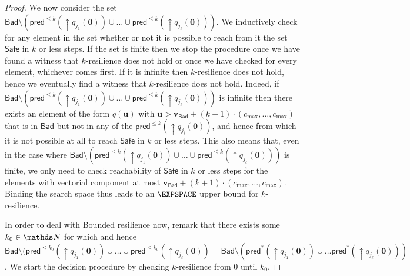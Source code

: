 \documentclass[runningheads]{llncs}
\newcommand{\pred}{\textsf{pred}}
\newcommand{\Bad}{\textsf{Bad}}
\newcommand{\Safe}{\textsf{Safe}}
\begin{document}
\begin{proof}
We now consider the set 
$\Bad \setminus (\pred^{\leq k}(\mathop{\uparrow} q_{j_1}(\textbf{0})) \cup \ldots \cup \pred^{\leq k}(\mathop{\uparrow} q_{j_\ell}(\textbf{0})) )$.
We inductively check for any element in the set whether or not it is possible to reach from it the set $\Safe$ in $k$ or less steps.
If the set is finite then we stop the procedure once we have found a witness that $k$-resilience does not hold or once we have checked for every element, whichever comes first.
If it is infinite then
$k$-resilience does not hold, 
hence we eventually find a witness that $k$-resilience does not hold.
Indeed, 
if
$\Bad \setminus (\pred^{\leq k}(\mathop{\uparrow} q_{j_1}(\textbf{0})) \cup \ldots \cup \pred^{\leq k}(\mathop{\uparrow} q_{j_\ell}(\textbf{0})) )$
is
infinite
then
there exists an element of the form $q(\textbf{u} )$
with $\textbf{u} > \textbf{v}_{\Bad} + (k+1) \cdot (c_{\max}, \ldots, c_{\max})$ 
that is in $\Bad$ but not in any of the $\pred^{\leq k}(\mathop{\uparrow} q_{j_i}(\textbf{0}))$,
and hence from which it is not possible at all to reach
$\Safe$ in $k$ or less steps. This also means that, even in the case where $\Bad \setminus (\pred^{\leq k}(\mathop{\uparrow} q_{j_1}(\textbf{0})) \cup \ldots \cup \pred^{\leq k}(\mathop{\uparrow} q_{j_\ell}(\textbf{0})) )$ is finite, we only need to check reachability of $\Safe$ in $k$ or less steps for the elements with vectorial component at most
$ \textbf{v}_{\Bad} + (k+1) \cdot (c_{\max}, \ldots, c_{\max})$. Binding the search space
thus leads to an $\EXPSPACE$ upper bound for {\sc $k$-resilience}.


In order to deal with {\sc Bounded resilience} now, remark that there exists some $k_0 \in \N$ for which
and hence
$\Bad \setminus (\pred^{\leq k_0}(\mathop{\uparrow} q_{j_1}(\textbf{0}))\cup \ldots \cup \pred^{\leq k_0}(\mathop{\uparrow} q_{j_\ell}(\textbf{0}))= 
\Bad \setminus (\pred^{*}(\mathop{\uparrow} q_{j_1}(\textbf{0})) \cup \ldots \pred^{*}(\mathop{\uparrow} q_{j_\ell}(\textbf{0})) )$.
We start the decision procedure by checking {\sc $k$-resilience} from $0$ until $k_0$.


\end{proof}
\end{document}
